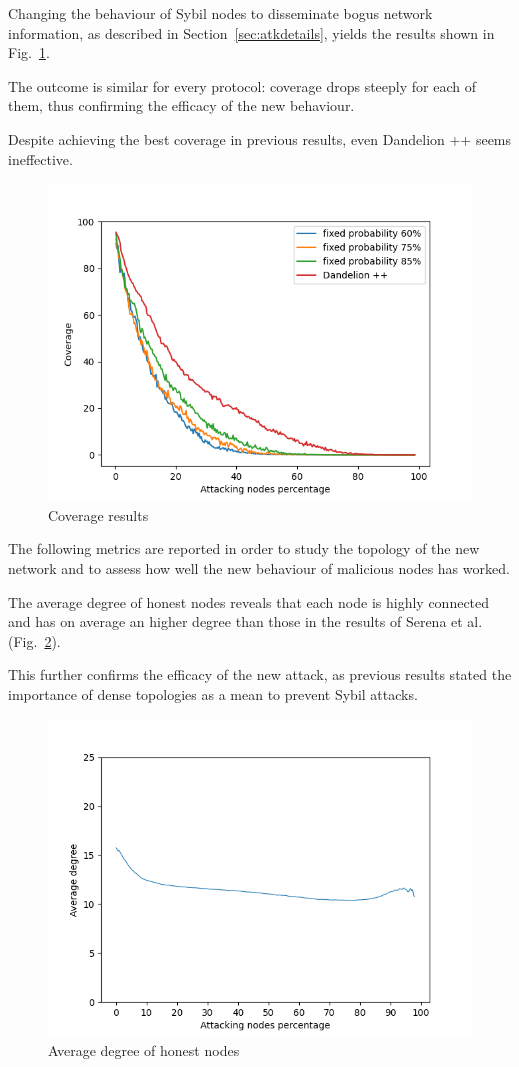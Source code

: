 Changing the behaviour of Sybil nodes to disseminate bogus network information, as described in Section~\ref{sec:atkdetails}, yields the results shown in Fig.~\ref{fig:in-cov}.

The outcome is similar for every protocol: coverage drops steeply for each of them, thus confirming the efficacy of the new behaviour.

Despite achieving the best coverage in previous results, even Dandelion ++ seems ineffective.\par

\begin{figure}[h]
	\includegraphics[width=.8\textwidth]{pict/results/in-cov.png}
	\centering 
	\caption{Coverage results}
	\label{fig:in-cov}
\end{figure}

The following metrics are reported in order to study the topology of the new network and to assess how well the new behaviour of malicious nodes has worked.

The average degree of honest nodes reveals that each node is highly connected and has on average an higher degree than those in the results of Serena et al. (Fig.~\ref{fig:degreehon}).

This further confirms the efficacy of the new attack, as previous results stated the importance of dense topologies as a mean to prevent Sybil attacks.\par

\begin{figure}[h]
	\includegraphics[width=.8\textwidth]{pict/results/in-hon-avg-neigh.png}
	\centering
	\caption{Average degree of honest nodes}
	\label{fig:degreehon}
\end{figure}

